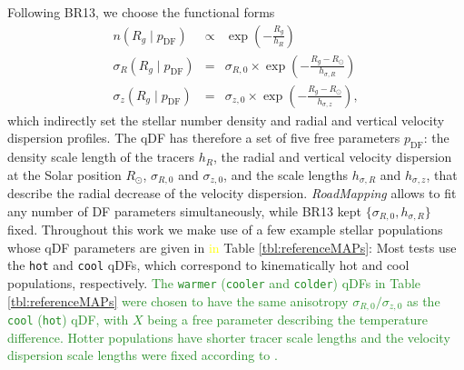 \documentclass[iop,revtex4,numberedappendix,appendixfloats]{emulateapj}
\newcommand{\RM}{{\sl RoadMapping}}
\newcommand{\NEW}[1]{\textcolor{ForestGreen}{#1}}
\newcommand{\OLD}[1]{\textcolor{Yellow}{#1}}%
\begin{document}
Following BR13, we choose the functional forms
\begin{eqnarray}
n(R_g \mid p_\text{DF}) &\propto& \exp\left(-\frac{R_g}{h_R} \right)\\
\sigma_R(R_g \mid p_\text{DF}) &=& \sigma_{R,0} \times \exp\left(- \frac{R_g-R_\odot}{h_{\sigma,R}} \right)\label{eq:sigmaRRg}\\
\sigma_z(R_g \mid p_\text{DF}) &=& \sigma_{z,0} \times \exp\left(- \frac{R_g-R_\odot}{h_{\sigma,z}} \right)\label{eq:sigmazRg},
\end{eqnarray}
which indirectly set the stellar number density and radial and vertical velocity dispersion profiles. The qDF has therefore a set of five free parameters $p_\text{DF}$: the density scale length of the tracers $h_R$, the radial and vertical velocity dispersion at the Solar position $R_\odot$, $\sigma_{R,0}$ and $\sigma_{z,0}$, and the scale lengths $h_{\sigma,R}$ and $h_{\sigma,z}$, that describe the radial decrease of the velocity dispersion. \RM{} allows to fit any number of DF parameters simultaneously, while BR13 kept $\{\sigma_{R,0},h_{\sigma,R}\}$ fixed. Throughout this work we make use of a few example stellar populations whose qDF parameters are given in \OLD{in} Table \ref{tbl:referenceMAPs}: Most tests use the \texttt{hot} and \texttt{cool} qDFs, which correspond to kinematically hot and cool populations, respectively. \NEW{The \texttt{warmer} (\texttt{cooler} and \texttt{colder}) qDFs in Table \ref{tbl:referenceMAPs} were chosen to have the same anisotropy $\sigma_{R,0}/\sigma_{z,0}$ as the \texttt{cool} (\texttt{hot}) qDF, with $X$ being a free parameter describing the temperature difference. Hotter populations have shorter tracer scale lengths \citep{2012ApJ...753..148B} and the velocity dispersion scale lengths were fixed according to \citet{2012ApJ...755..115B}.}
\end{document}

